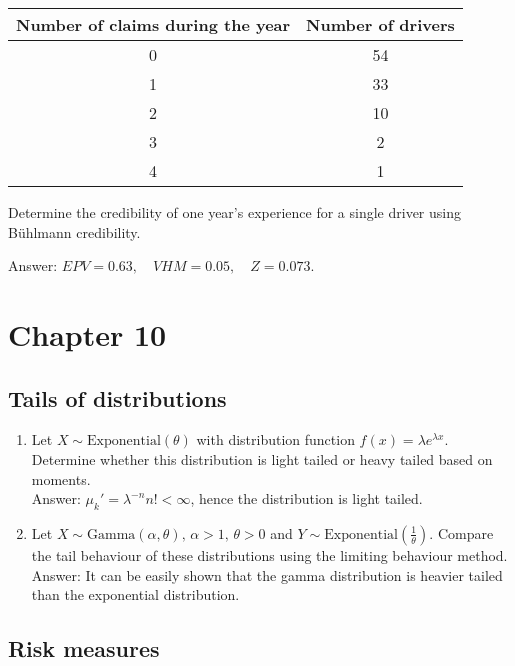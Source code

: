 \documentclass[11pt,a4paper,onecolumn]{article}
\begin{document}
\begin{enumerate}
	\begin{table}[H]
		\centering
		\begin{tabular}{cc}
			\hline
			Number of claims during the year & Number of drivers\\
			\hline
			0 & 54\\
			1 & 33\\
			2&10\\
			3&2\\
			4& 1\\
			\hline
		\end{tabular}
	\end{table}
Determine the credibility of one year's experience for a single driver using B\"{u}hlmann credibility. \par
Answer: $EPV = 0.63,\quad VHM = 0.05,\quad Z = 0.073$.
	\end{enumerate}
\section{Chapter 10}

\subsection{Tails of distributions}
\begin{enumerate}
\item Let $X\sim \text{Exponential} (\theta)$ with distribution function $f(x) = \lambda e^{\lambda x}$. Determine whether this distribution is light tailed or heavy tailed based on moments. \\
Answer: $\mu_k' = \lambda^{-n}n! <\infty$, hence the distribution is light tailed.
\item Let $X\sim \text{Gamma}(\alpha,\theta),\,\alpha>1,\,\theta>0$ and $Y\sim \text{Exponential}(\frac{1}{\theta})$. Compare the tail behaviour of these distributions using the limiting behaviour method. \\
Answer: It can be easily shown that the gamma distribution is heavier tailed than the exponential distribution.
\end{enumerate}
\subsection{Risk measures}
\end{document}
